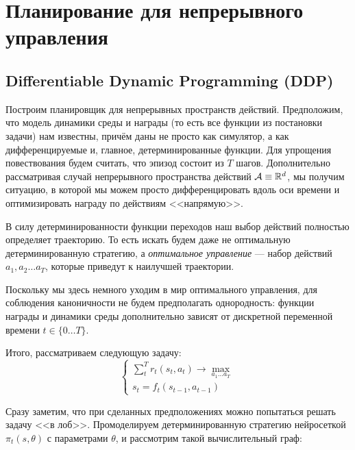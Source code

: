 \section{Планирование для непрерывного управления}\label{lqrsection}

\subsection{Differentiable Dynamic Programming (DDP)}


Построим планировщик для непрерывных пространств действий. Предположим, что модель динамики среды и награды (то есть все функции из постановки задачи) нам известны, причём даны не просто как симулятор, а как дифференцируемые и, главное, детерминированные функции. Для упрощения повествования будем считать, что эпизод состоит из $T$ шагов. Дополнительно рассматривая случай непрерывного пространства действий $\A \HM\equiv \R^d$, мы получим ситуацию, в которой мы можем просто дифференцировать вдоль оси времени и оптимизировать награду по действиям <<напрямую>>.

В силу детерминированности функции переходов наш выбор действий полностью определяет траекторию. То есть искать будем даже не оптимальную детерминированную стратегию, а \emph{оптимальное управление} --- набор действий $a_1, a_2 \dots a_T$, которые приведут к наилучшей траектории. 

Поскольку мы здесь немного уходим в мир оптимального управления, для соблюдения каноничности не будем предполагать однородность: функции награды и динамики среды дополнительно зависят от дискретной переменной времени $t \in \{0 \dots T\}$. 

Итого, рассматриваем следующую задачу:
\begin{equation}\label{LQRtask}
\begin{cases}
\sum_t^T r_t(s_t, a_t) \to \max\limits_{a_1 \dots a_T} \\
s_t = f_t(s_{t-1}, a_{t-1})
\end{cases}
\end{equation}

Сразу заметим, что при сделанных предположениях можно попытаться решать задачу <<в лоб>>. Промоделируем детерминированную стратегию  нейросеткой $\pi_t(s, \theta)$ с параметрами $\theta$, и рассмотрим такой вычислительный граф:

